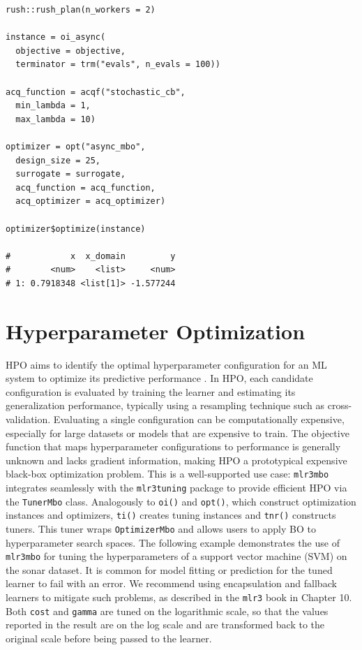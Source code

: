 \documentclass[12pt,letterpaper]{article}
\begin{document}
\begin{verbatim}
rush::rush_plan(n_workers = 2)

instance = oi_async(
  objective = objective,
  terminator = trm("evals", n_evals = 100))

acq_function = acqf("stochastic_cb",
  min_lambda = 1,
  max_lambda = 10)

optimizer = opt("async_mbo",
  design_size = 25,
  surrogate = surrogate,
  acq_function = acq_function,
  acq_optimizer = acq_optimizer)

optimizer$optimize(instance)

#            x  x_domain         y
#        <num>    <list>     <num>
# 1: 0.7918348 <list[1]> -1.577244
\end{verbatim}

\section{Hyperparameter Optimization}

\label{sec:hpo}

HPO aims to identify the optimal hyperparameter configuration for an ML system to optimize its predictive performance \cite{feurer2019,bischl2023,franceschi2025}.
In HPO, each candidate configuration is evaluated by training the learner and estimating its generalization performance, typically using a resampling technique such as cross-validation.
Evaluating a single configuration can be computationally expensive, especially for large datasets or models that are expensive to train.
The objective function that maps hyperparameter configurations to performance is generally unknown and lacks gradient information, making HPO a prototypical expensive black-box optimization problem.
This is a well-supported use case: \texttt{mlr3mbo} integrates seamlessly with the \texttt{mlr3tuning}\cite{becker2025a} package to provide efficient HPO via the \texttt{TunerMbo} class.
Analogously to \texttt{oi()} and \texttt{opt()}, which construct optimization instances and optimizers, \texttt{ti()} creates tuning instances and \texttt{tnr()} constructs tuners.
This tuner wraps \texttt{OptimizerMbo} and allows users to apply BO to hyperparameter search spaces.
The following example demonstrates the use of \texttt{mlr3mbo} for tuning the hyperparameters of a support vector machine (SVM) on the sonar dataset.
It is common for model fitting or prediction for the tuned learner to fail with an error.
We recommend using encapsulation and fallback learners to mitigate such problems, as described in the \texttt{mlr3} book\cite{bischl2024} in Chapter 10.
Both \texttt{cost} and \texttt{gamma} are tuned on the logarithmic scale, so that the values reported in the result are on the log scale and are transformed back to the original scale before being passed to the learner.
\end{document}
